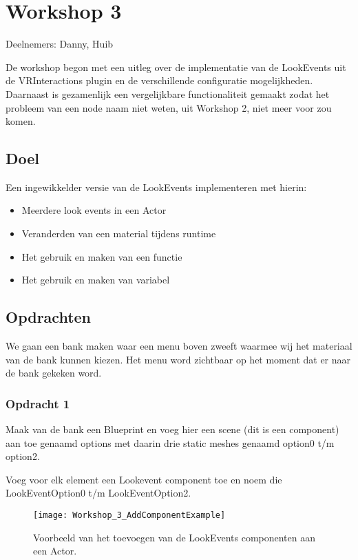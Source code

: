 
\chapter{Workshop 3}
\label{appendix:workshop3}
\lhead{}
Deelnemers: Danny, Huib

De workshop begon met een uitleg over de implementatie van de LookEvents uit de VRInteractions plugin en de verschillende configuratie mogelijkheden. Daarnaast is gezamenlijk een vergelijkbare functionaliteit gemaakt zodat het probleem van een node naam niet weten, uit Workshop 2, niet meer voor zou komen.

\section{Doel}
Een ingewikkelder versie van de LookEvents implementeren met hierin:

\begin{itemize}
	\item Meerdere look events in een Actor
	\item Veranderden van een material tijdens runtime
	\item Het gebruik en maken van een functie
	\item Het gebruik en maken van variabel
\end{itemize}

\section{Opdrachten}

We gaan een bank maken waar een menu boven zweeft waarmee wij het materiaal van de bank kunnen kiezen. Het menu word zichtbaar op het moment dat er naar de bank gekeken word.

\subsection{Opdracht 1}
Maak van de bank een Blueprint en voeg hier een scene (dit is een component) aan toe genaamd options met daarin drie static meshes genaamd option0 t/m option2.

Voeg voor elk element een Lookevent component toe en noem die LookEventOption0 t/m LookEventOption2.

\begin{figure}[!ht]
  \centering
    \texttt{[image: Workshop\_3\_AddComponentExample]}
    \caption{Voorbeeld van het toevoegen van de LookEvents componenten aan een Actor.}
\end{figure}

